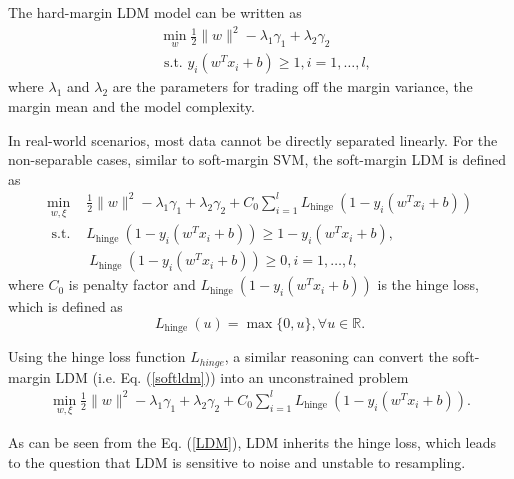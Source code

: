 \documentclass[a4paper]{cas-sc}
\begin{document}
The hard-margin LDM model can be written as
\begin{equation}
\begin{aligned}
\label{hard-ldm}
&\min _{w} \frac{1}{2}\|w\|^{2}-\lambda_{1} \gamma_{1}+\lambda_{2} \gamma_{2} \\
&\text { s.t. } y_{i} (w^{T} x_{i}+b) \geq 1, i=1, \ldots, l,
\end{aligned}
\end{equation}
where $\lambda_1$ and $\lambda_2$ are the parameters for trading off the margin variance, the margin mean and the model complexity.

In real-world scenarios, most data cannot be directly separated linearly. For the non-separable cases, similar to soft-margin SVM, the soft-margin LDM is defined as
\begin{equation}
\label{softldm}
\begin{aligned}
\min _{w,\xi} & \frac{1}{2}\|w\|^{2}-\lambda_{1} \gamma_{1}+\lambda_{2} \gamma_{2}+C_{0} \sum_{i=1}^{l} L_{\text {hinge }}\left(1-y_{i}\left(w^{T} x_{i}+b\right)\right) \\
\text { s.t. } & L_{\text {hinge }}\left(1-y_{i}\left(w^{T} x_{i}+b\right)\right) \geq 1-y_{i} (w^{T} x_{i}+b),\\
&\ L_{\text {hinge }}\left(1-y_{i}\left(w^{T} x_{i}+b\right)\right) \geq 0, i=1, \ldots, l,
\end{aligned}
\end{equation}
where $C_0$ is penalty factor and $L_{\text {hinge }}\left(1-y_{i}\left(w^{T} x_{i}+b\right)\right)$ is the hinge loss, which is defined as
\begin{equation}
\label{hinge}
L_{\text {hinge }}(u)=\max \{0, u\}, \forall u \in \mathbb{R}.
\end{equation}


Using the hinge loss function $L_{hinge}$, a similar reasoning can convert the soft-margin LDM (i.e. Eq. (\ref{softldm})) into an unconstrained problem
\begin{align}
\label{LDM}
\min _{w, \xi} \frac{1}{2}\|w\|^{2}-\lambda_{1} \gamma_{1}+\lambda_{2} \gamma_{2}+C_{0} \sum_{i=1}^{l} L_{\text {hinge }}\left(1-y_{i}\left(w^{T} x_{i}+b\right)\right).
\end{align}

As can be seen from the Eq. (\ref{LDM}), LDM inherits the hinge loss, which leads to the question that LDM is sensitive to noise and unstable to resampling.
\end{document}
